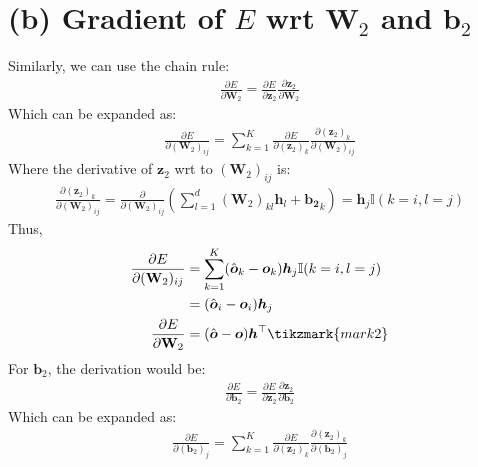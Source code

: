 \documentclass[11pt, a4paper, oneside]{memoir}
\begin{document}
\section*{(b) Gradient of $E$ wrt $\mathbf{W}_2$ and $\boldsymbol{b}_2$}
Similarly, we can use the chain rule:
\begin{align*}
    \frac{\partial E}{\partial \mathbf{W}_2} = \frac{\partial E}{\partial \boldsymbol{z}_2} \frac{\partial \boldsymbol{z}_2}{\partial \mathbf{W}_2}
\end{align*}
Which can be expanded as:
\begin{align*}
    \frac{\partial E}{\partial (\mathbf{W}_2)_{ij}} = \sum_{k=1}^{K} \frac{\partial E}{\partial (\boldsymbol{z}_2)_k} \frac{\partial (\boldsymbol{z}_2)_k}{\partial (\mathbf{W}_2)_{ij}}
\end{align*}
Where the derivative of $\boldsymbol{z}_2$ wrt to $(\mathbf{W}_2)_{ij}$ is:
\begin{align*}
    \frac{\partial (\boldsymbol{z}_2)_k}{\partial (\mathbf{W}_2)_{ij}} = \frac{\partial}{\partial (\mathbf{W}_2)_{ij}} \left( \sum_{l=1}^{d} (\mathbf{W}_2)_{kl} \boldsymbol{h}_l + \boldsymbol{b_2}_k \right) = \boldsymbol{h}_j \mathbb{I}(k=i,l=j)
\end{align*}
Thus,
\begin{align*}
    \frac{\partial E}{\partial (\mathbf{W}_2)_{ij}} &= \sum_{k=1}^{K} (\hat{\boldsymbol{o}}_k - \boldsymbol{o}_k) \boldsymbol{h}_j \mathbb{I}(k=i,l=j) \\
    &= (\hat{\boldsymbol{o}}_i - \boldsymbol{o}_i) \boldsymbol{h}_j \\
    \frac{\partial E}{\partial \mathbf{W}_2} &= (\hat{\boldsymbol{o}} - \boldsymbol{o}) \boldsymbol{h}^\top
    \tikzmark{mark2}
\end{align*}
For $\boldsymbol{b}_2$, the derivation would be:
\begin{align*}
    \frac{\partial E}{\partial \boldsymbol{b}_2} = \frac{\partial E}{\partial \boldsymbol{z}_2} \frac{\partial \boldsymbol{z}_2}{\partial \boldsymbol{b}_2}
\end{align*}
Which can be expanded as:
\begin{align*}
    \frac{\partial E}{\partial (\boldsymbol{b}_2)_j} = \sum_{k=1}^{K} \frac{\partial E}{\partial (\boldsymbol{z}_2)_k} \frac{\partial (\boldsymbol{z}_2)_k}{\partial (\boldsymbol{b}_2)_j}
\end{align*}
\end{document}
